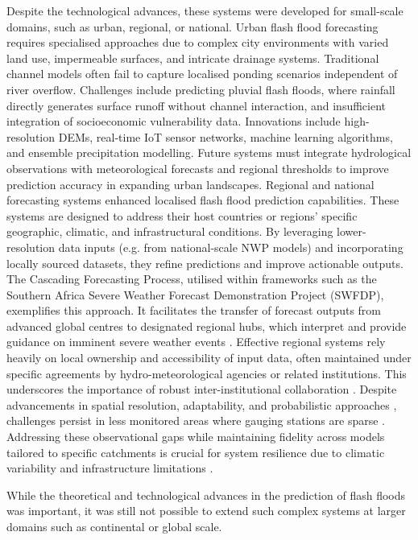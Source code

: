 Despite the technological advances, these systems were developed for small-scale domains, such as urban, regional, or national. Urban flash flood forecasting requires specialised approaches due to complex city environments with varied land use, impermeable surfaces, and intricate drainage systems. Traditional channel models often fail to capture localised ponding scenarios independent of river overflow. Challenges include predicting pluvial flash floods, where rainfall directly generates surface runoff without channel interaction, and insufficient integration of socioeconomic vulnerability data. Innovations include high-resolution DEMs, real-time IoT sensor networks, machine learning algorithms, and ensemble precipitation modelling. Future systems must integrate hydrological observations with meteorological forecasts and regional thresholds to improve prediction accuracy in expanding urban landscapes. Regional and national forecasting systems enhanced localised flash flood prediction capabilities. These systems are designed to address their host countries or regions' specific geographic, climatic, and infrastructural conditions. By leveraging lower-resolution data inputs (e.g. from national-scale NWP models) and incorporating locally sourced datasets, they refine predictions and improve actionable outputs. The Cascading Forecasting Process, utilised within frameworks such as the Southern Africa Severe Weather Forecast Demonstration Project (SWFDP), exemplifies this approach. It facilitates the transfer of forecast outputs from advanced global centres to designated regional hubs, which interpret and provide guidance on imminent severe weather events \citep{Jubach2016}. Effective regional systems rely heavily on local ownership and accessibility of input data, often maintained under specific agreements by hydro-meteorological agencies or related institutions. This underscores the importance of robust inter-institutional collaboration \citep{Georgakakos2022}. Despite advancements in spatial resolution, adaptability, and probabilistic approaches \citep{Zanchetta2020, AlRawas2024}, challenges persist in less monitored areas where gauging stations are sparse \citep{Kuksina2020}. Addressing these observational gaps while maintaining fidelity across models tailored to specific catchments is crucial for system resilience due to climatic variability and infrastructure limitations \citep{Liu2011, Douinot2016}. 

While the theoretical and technological advances in the prediction of flash floods was important, it was still not possible to extend such complex systems at larger domains such as continental or global scale. 

